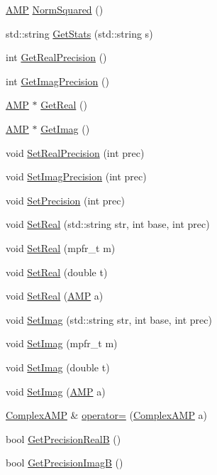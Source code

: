 \begin{DoxyCompactItemize}
\hyperlink{class_a_m_p}{A\+M\+P} \hyperlink{class_complex_a_m_p_a1619171701c1c4a2197089eb4e4de7e4}{Norm\+Squared} ()
\item 
std\+::string \hyperlink{class_complex_a_m_p_a84b1541f74031f73148a13bf7f767fda}{Get\+Stats} (std\+::string s)
\item 
int \hyperlink{class_complex_a_m_p_a6c996530938a3f1a1404a341592c8b23}{Get\+Real\+Precision} ()
\item 
int \hyperlink{class_complex_a_m_p_a9856f877e22bb67158b05f98a38f2ccf}{Get\+Imag\+Precision} ()
\item 
\hyperlink{class_a_m_p}{A\+M\+P} $\ast$ \hyperlink{class_complex_a_m_p_a0bfcde48569256c228b65e7512fdb89f}{Get\+Real} ()
\item 
\hyperlink{class_a_m_p}{A\+M\+P} $\ast$ \hyperlink{class_complex_a_m_p_a35d1272197c25f115584ce76276114b3}{Get\+Imag} ()
\item 
void \hyperlink{class_complex_a_m_p_a3550d8128f4a70e4b1e7f93541de6628}{Set\+Real\+Precision} (int prec)
\item 
void \hyperlink{class_complex_a_m_p_ad33a9d37aec8210b610be96de637caa0}{Set\+Imag\+Precision} (int prec)
\item 
void \hyperlink{class_complex_a_m_p_a5121db2ef54a7916ed5c689dd93513e0}{Set\+Precision} (int prec)
\item 
void \hyperlink{class_complex_a_m_p_ab571ade48e4865953e40c8d8b0a84477}{Set\+Real} (std\+::string str, int base, int prec)
\item 
void \hyperlink{class_complex_a_m_p_a1b656e9391f52104e4ea2c0002f2ce2e}{Set\+Real} (mpfr\+\_\+t m)
\item 
void \hyperlink{class_complex_a_m_p_a0f16900ee31a821a9b8bf0817f3d94bb}{Set\+Real} (double t)
\item 
void \hyperlink{class_complex_a_m_p_ac110d5d5d56d8c6cd3dd6c9b9fb8c918}{Set\+Real} (\hyperlink{class_a_m_p}{A\+M\+P} a)
\item 
void \hyperlink{class_complex_a_m_p_ae3b29305bee9519cf24a6a32bdc1f630}{Set\+Imag} (std\+::string str, int base, int prec)
\item 
void \hyperlink{class_complex_a_m_p_ac7ff9e0aed1f8e63ff3a2ccd1dad2b49}{Set\+Imag} (mpfr\+\_\+t m)
\item 
void \hyperlink{class_complex_a_m_p_a085c12a641deb1a8992786f7992563ac}{Set\+Imag} (double t)
\item 
void \hyperlink{class_complex_a_m_p_a0457938c2e513636fc7bccf97cd84ea8}{Set\+Imag} (\hyperlink{class_a_m_p}{A\+M\+P} a)
\item 
\hyperlink{class_complex_a_m_p}{Complex\+A\+M\+P} \& \hyperlink{class_complex_a_m_p_ab9ca8a5ffd07d507db072daa59970070}{operator=} (\hyperlink{class_complex_a_m_p}{Complex\+A\+M\+P} a)
\item 
bool \hyperlink{class_complex_a_m_p_a9e8c8a8df3cd3dbdd51d002b926fcf9c}{Get\+Precision\+Real\+B} ()
\item 
bool \hyperlink{class_complex_a_m_p_ada99d00434efada480e7829638e84751}{Get\+Precision\+Imag\+B} ()
\end{DoxyCompactItemize}
